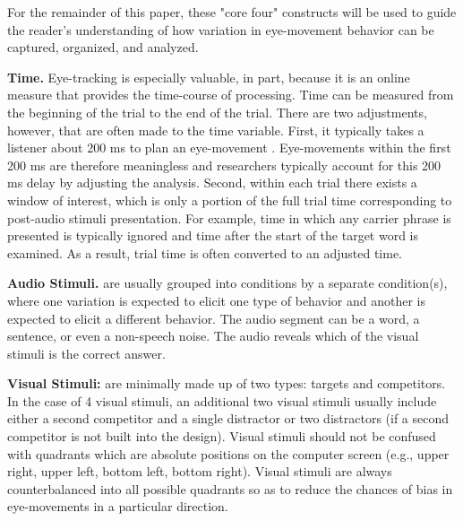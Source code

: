 For the remainder of this paper, these "core four" constructs will be used to guide the reader's understanding of how variation in eye-movement behavior can be captured, organized, and analyzed. 

\textbf{Time.} Eye-tracking is especially valuable, in part, because it is an online measure that provides the time-course of processing. Time can be measured from the beginning of the trial to the end of the trial. There are two adjustments, however, that are often made to the time variable. First, it typically takes a listener about 200 ms to plan an eye-movement \parencite[][]{Matin_Shao_Boff_1993}. Eye-movements within the first 200 ms are therefore meaningless and researchers typically account for this 200 ms delay by adjusting the analysis. Second, within each trial there exists a  window of interest, which is only a portion of the full trial time corresponding to post-audio stimuli presentation. For example, time in which any carrier phrase is presented is typically ignored and time after the start of the target word is examined. As a result, trial time is often converted to an adjusted time.

\textbf{Audio Stimuli.} are usually grouped into conditions by a separate condition(s), where one variation is expected to elicit one type of behavior and another is expected to elicit a different behavior. The audio segment can be a word, a sentence, or even a non-speech noise. The audio reveals which of the visual stimuli is the correct answer. 

\textbf{Visual Stimuli:} are minimally made up of two types: targets and competitors. In the case of 4 visual stimuli, an additional two visual stimuli usually include either a second competitor and a single distractor or two distractors (if a second competitor is not built into the design). Visual stimuli should not be confused with quadrants which are absolute positions on the computer screen (e.g., upper right, upper left, bottom left, bottom right). Visual stimuli are always counterbalanced into all possible quadrants so as to reduce the chances of bias in eye-movements in a particular direction. 


